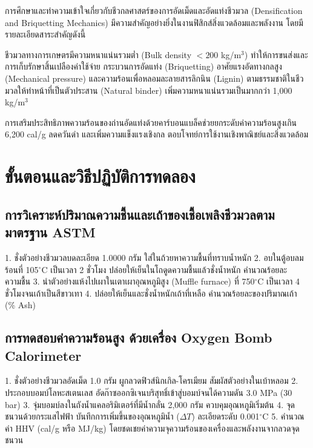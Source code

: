 การศึกษาและทำความเข้าใจเกี่ยวกับชีวกลศาสตร์ของการอัดเม็ดและอัดแท่งชีวมวล (Densification and Briquetting Mechanics) มีความสำคัญอย่างยิ่งในงานฟิสิกส์สิ่งแวดล้อมและพลังงาน โดยมีรายละเอียดสาระสำคัญดังนี้

ชีวมวลทางการเกษตรมีความหนาแน่นรวมต่ำ (Bulk density $< 200$ kg/m$^3$) ทำให้การขนส่งและการเก็บรักษาสิ้นเปลืองค่าใช้จ่าย กระบวนการอัดแท่ง (Briquetting) อาศัยแรงอัดทางกลสูง (Mechanical pressure) และความร้อนเพื่อหลอมละลายสารลิกนิน (Lignin) ตามธรรมชาติในชีวมวลให้ทำหน้าที่เป็นตัวประสาน (Natural binder) เพิ่มความหนาแน่นรวมเป็นมากกว่า 1,000 kg/m$^3$

\begin{flamebox}
การเสริมประสิทธิภาพความร้อนของถ่านอัดแท่งด้วยคาร์บอนแบล็คช่วยยกระดับค่าความร้อนสูงเกิน 6,200 cal/g ลดควันดำ และเพิ่มความแข็งแรงเชิงกล ตอบโจทย์การใช้งานเชิงพาณิชย์และสิ่งแวดล้อม
\end{flamebox}

\section{ขั้นตอนและวิธีปฏิบัติการทดลอง}

\subsection{การวิเคราะห์ปริมาณความชื้นและเถ้าของเชื้อเพลิงชีวมวลตามมาตรฐาน ASTM}
\begin{conceptbox}
1. ชั่งตัวอย่างชีวมวลบดละเอียด 1.0000 กรัม ใส่ในถ้วยหาความชื้นที่ทราบน้ำหนัก
2. อบในตู้อบลมร้อนที่ 105$^{\circ}$C เป็นเวลา 2 ชั่วโมง ปล่อยให้เย็นในโถดูดความชื้นแล้วชั่งน้ำหนัก คำนวณร้อยละความชื้น
3. นำตัวอย่างแห้งไปเผาในเตาเผาอุณหภูมิสูง (Muffle furnace) ที่ 750$^{\circ}$C เป็นเวลา 4 ชั่วโมงจนเถ้าเป็นสีขาวเทา
4. ปล่อยให้เย็นและชั่งน้ำหนักเถ้าที่เหลือ คำนวณร้อยละของปริมาณเถ้า (\% Ash)
\end{conceptbox}

\subsection{การทดสอบค่าความร้อนสูง ด้วยเครื่อง Oxygen Bomb Calorimeter}
\begin{conceptbox}
1. ชั่งตัวอย่างชีวมวลอัดเม็ด 1.0 กรัม ผูกลวดฟิวส์นิกเกิล-โครเมียม สัมผัสตัวอย่างในเบ้าหลอม
2. ประกอบบอมบ์โลหะสเตนเลส อัดก๊าซออกซิเจนบริสุทธิ์เข้าสู่บอมบ์จนได้ความดัน 3.0 MPa (30 bar)
3. จุ่มบอมบ์ลงในถังน้ำแคลอริมิเตอร์ที่มีน้ำกลั่น 2,000 กรัม ควบคุมอุณหภูมิเริ่มต้น
4. จุดชนวนด้วยกระแสไฟฟ้า บันทึกการเพิ่มขึ้นของอุณหภูมิน้ำ ($\Delta T$) ละเอียดระดับ 0.001$^{\circ}$C
5. คำนวณค่า HHV (cal/g หรือ MJ/kg) โดยชดเชยค่าความจุความร้อนของเครื่องและพลังงานจากลวดจุดชนวน
\end{conceptbox}

